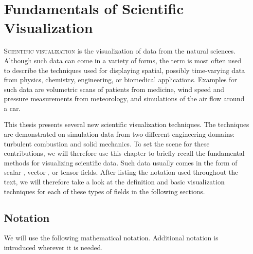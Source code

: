\chapter{Fundamentals of Scientific Visualization} %
\label{cha:fundamentals}
%
\lettrine[lines=3, findent=-2pt, nindent=5pt, loversize=0.02]{S}{cientific
visualization} is the visualization of data from the natural sciences.
%
Although such data can come in a variety of forms, the term is most often used
to describe the techniques used for displaying spatial, possibly time-varying
data from physics, chemistry, engineering, or biomedical applications.
%
Examples for such data are volumetric scans of patients from medicine, wind
speed and pressure measurements from meteorology, and simulations of the air
flow around a car.
%

%
This thesis presents several new scientific visualization techniques.
%
The techniques are demonstrated on simulation data from two different
engineering domains: turbulent combustion and solid mechanics.
%
To set the scene for these contributions, we will therefore use this chapter to
briefly recall the fundamental methods for visualizing scientific data.
%
Such data usually comes in the form of scalar-, vector-, or tensor fields.
%
After listing the notation used throughout the text, we will therefore take a
look at the definition and basic visualization techniques for each of these
types of fields in the following sections.
%

%
\section{Notation} %
\label{sec:notation}
%
We will use the following mathematical notation.
%
Additional notation is introduced wherever it is needed.
%




